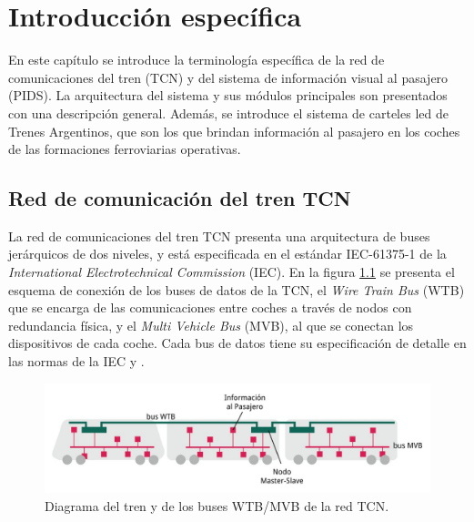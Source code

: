 \chapter{Introducción específica} %

\label{Chapter2}

En este capítulo se introduce la terminología específica de la red de comunicaciones del tren (TCN) y del sistema de información visual al pasajero (PIDS). La arquitectura del sistema y  sus módulos principales son presentados con una descripción general. Además, se introduce el sistema de carteles led de Trenes Argentinos, que son los que brindan información al pasajero en los coches de las formaciones ferroviarias operativas.\\


\section{Red de comunicación del tren TCN}

La red de comunicaciones del tren TCN presenta una arquitectura de buses jerárquicos de dos niveles, y está especificada en el estándar IEC-61375-1 \cite{IEC-61375-1999} de la \textit{International Electrotechnical Commission} (IEC). En la figura \ref{fig:redTCN} se presenta el esquema de conexión de los buses de datos de la TCN, el \textit{Wire Train Bus} (WTB) que se encarga de las comunicaciones entre coches a través de nodos con redundancia física, y el \textit{Multi Vehicle Bus} (MVB), al que se conectan los dispositivos de cada coche. 
Cada bus de datos tiene su especificación de detalle en las normas de la IEC \citep{CSN-EN-61375-2-1} y \citep{IEC-61375-3-1:2012}. \\

\begin{figure}[ht]
	\centering
	\includegraphics[width=1\textwidth]{./Figures/diagramaRedTCN.png}
	\caption{Diagrama del tren y de los buses WTB/MVB de la red TCN.}
	\label{fig:redTCN}
\end{figure}


